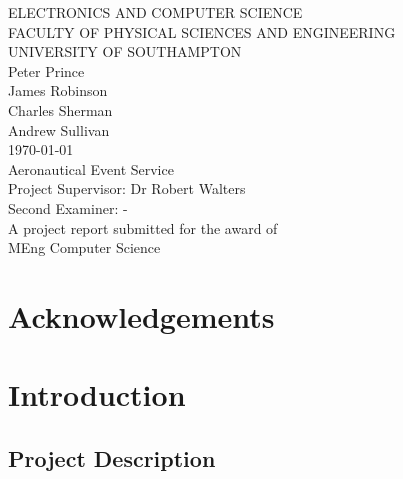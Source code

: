 \documentclass[a4paper, 12pt]{article}
\begin{document}
\begin{titlepage}

	\center

	{\large ELECTRONICS AND COMPUTER SCIENCE}\\[0.2cm]
	{\large FACULTY OF PHYSICAL SCIENCES AND ENGINEERING}\\[0.2cm]
	{\large UNIVERSITY OF SOUTHAMPTON}\\[3cm]

	{\Large Peter Prince}\\[0.2cm]
	{\Large James Robinson}\\[0.2cm]
	{\Large Charles Sherman}\\[0.2cm]
	{\Large Andrew Sullivan}\\[1cm]
	{\Large \today}\\[3cm]

	{\LARGE Aeronautical Event Service}\\[3cm]

	{\large Project Supervisor: Dr Robert Walters}\\[0.2cm]
	{\large Second Examiner: -}\\[2.5cm]

	{\large A project report submitted for the award of}\\[0.2cm]
	{\Large MEng Computer Science}

\end{titlepage}

\begin{abstract}

\end{abstract}

\newpage

\section*{Acknowledgements}

\newpage

\tableofcontents
\newpage

\listoffigures
\newpage

\section{Introduction}
\label{sec:introduction}

\subsection{Project Description}
\end{document}
